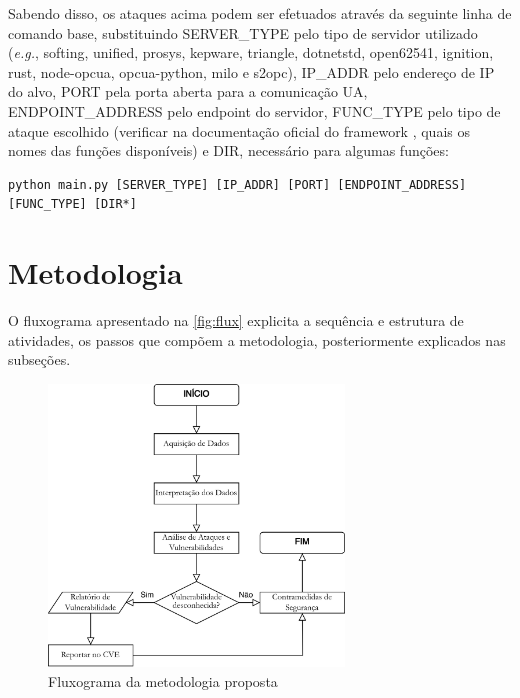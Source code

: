    Sabendo disso, os ataques acima podem ser efetuados através da seguinte linha de comando base, substituindo SERVER\_TYPE pelo tipo de servidor utilizado (\textit{e.g.}, softing, unified, prosys, kepware, triangle, dotnetstd, open62541, ignition, rust, node-opcua, opcua-python, milo e s2opc), IP\_ADDR pelo endereço de IP do alvo, PORT pela porta aberta para a comunicação UA, ENDPOINT\_ADDRESS pelo endpoint do servidor, FUNC\_TYPE pelo tipo de ataque escolhido (verificar na documentação oficial do framework \cite{claroty2023}, quais os nomes das funções disponíveis) e DIR, necessário para algumas funções:

    \begin{verbatim}
python main.py [SERVER_TYPE] [IP_ADDR] [PORT] [ENDPOINT_ADDRESS] [FUNC_TYPE] [DIR*]
    \end{verbatim}

\section{Metodologia}

    O fluxograma apresentado na \autoref{fig:flux} explicita a sequência e estrutura de atividades, os passos que compõem a metodologia, posteriormente explicados nas subseções.
    
    \begin{figure}[htbp!]
        \caption{\label{fig:flux}Fluxograma da metodologia proposta}
        \begin{center}
            \includegraphics[width=0.7\textwidth]{USPSC-img/fluxograma.png}
        \end{center}
    \end{figure}

